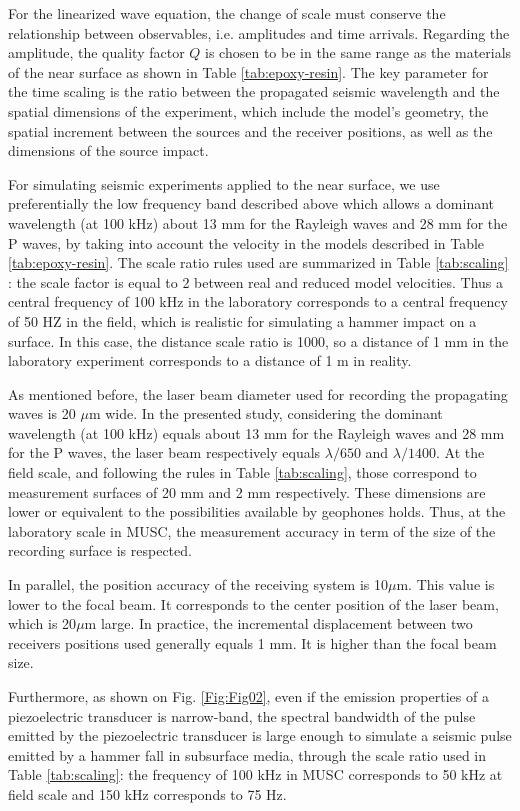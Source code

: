 \documentclass[extra,mreferee]{gji}
\begin{document}
For the linearized wave equation, the change of scale must conserve the relationship between observables, i.e. amplitudes and time arrivals. Regarding the amplitude, the quality factor $Q$ is chosen to be in the same range as the materials of the near surface as shown in Table \ref{tab:epoxy-resin}. The key parameter for the time scaling is the ratio between the propagated seismic wavelength and the spatial dimensions of the experiment, which include the model's geometry, the spatial increment between the sources and the receiver positions, as well as the dimensions of the source impact.

For simulating seismic experiments applied to the near surface, we use preferentially the low frequency band described above which allows a dominant wavelength (at 100 kHz) about 13 mm for the Rayleigh waves and 28 mm for the P waves, by taking into account the velocity in the models described in Table \ref{tab:epoxy-resin}. The scale ratio rules used are summarized in Table \ref{tab:scaling} : the scale factor is equal to 2 between real and reduced model velocities. Thus a central frequency of 100 kHz in the laboratory corresponds to a central frequency of 50 HZ in the field,  which is realistic for simulating a hammer impact on a surface. In this case, the distance scale ratio is 1000, so a distance of 1 mm in the laboratory experiment corresponds to a distance of 1 m in reality.

As mentioned before, the laser beam diameter used for recording the propagating waves is 20 $\mu$m wide. In the presented study, considering the dominant wavelength (at 100 kHz) equals about 13 mm for the Rayleigh waves and 28 mm for the P waves, the laser beam respectively equals  $\lambda /650 $ and $ \lambda /1400 $. At the field scale, and following the rules in Table \ref{tab:scaling}, those correspond to measurement surfaces of 20 mm and 2 mm respectively. These dimensions are lower or equivalent to the possibilities available by geophones holds. Thus, at the laboratory scale in MUSC, the measurement accuracy in term of the size of the recording surface is respected.

In parallel, the position accuracy of the receiving system is 10$\mu$m. This value is lower to the focal beam. It corresponds to the center position of the laser beam, which is 20$\mu $m large. In practice, the incremental displacement between two receivers positions used generally equals 1 mm. It is higher than the focal beam size.

Furthermore, as shown on Fig. \ref{Fig:Fig02}, even if the emission properties of a piezoelectric transducer is narrow-band, the spectral bandwidth of the pulse emitted by the piezoelectric transducer is large enough to simulate a seismic pulse emitted by a hammer fall in subsurface media, through the scale ratio used in Table \ref{tab:scaling}: the frequency of 100 kHz in MUSC corresponds to 50 kHz at field scale and 150 kHz corresponds to 75 Hz.
\end{document}
